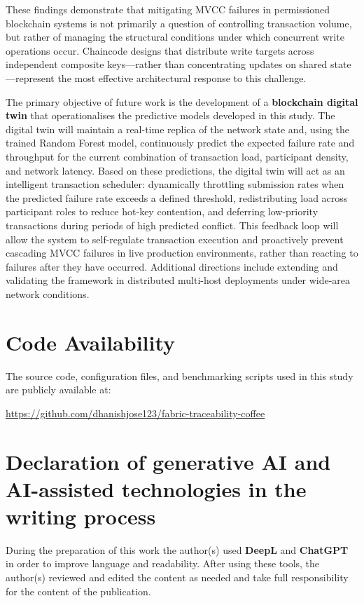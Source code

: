 \documentclass[12pt]{article}
\begin{document}
These findings demonstrate that mitigating MVCC failures in permissioned blockchain systems is not primarily a question of controlling transaction volume, but rather of managing the structural conditions under which concurrent write operations occur. Chaincode designs that distribute write targets across independent composite keys---rather than concentrating updates on shared state---represent the most effective architectural response to this challenge.

The primary objective of future work is the development of a \textbf{blockchain digital twin} that operationalises the predictive models developed in this study. The digital twin will maintain a real-time replica of the network state and, using the trained Random Forest model, continuously predict the expected failure rate and throughput for the current combination of transaction load, participant density, and network latency. Based on these predictions, the digital twin will act as an intelligent transaction scheduler: dynamically throttling submission rates when the predicted failure rate exceeds a defined threshold, redistributing load across participant roles to reduce hot-key contention, and deferring low-priority transactions during periods of high predicted conflict. This feedback loop will allow the system to self-regulate transaction execution and proactively prevent cascading MVCC failures in live production environments, rather than reacting to failures after they have occurred. Additional directions include extending and validating the framework in distributed multi-host deployments under wide-area network conditions.
	
	\section*{Code Availability}
	
	The source code, configuration files, and benchmarking scripts used in this study are publicly available at:
	
	\url{https://github.com/dhanishjose123/fabric-traceability-coffee}
	
	
	\section*{Declaration of generative AI and AI-assisted technologies in the writing process}
	During the preparation of this work the author(s) used \textbf{DeepL} and \textbf{ChatGPT} in order to improve language and readability. 
	After using these tools, the author(s) reviewed and edited the content as needed and take full responsibility for the content of the publication.
	
\end{document}
